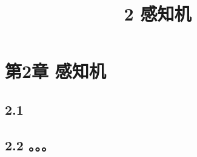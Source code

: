 \documentclass{article}
\begin{document}
\title{2 感知机}
\date{}
\maketitle
\else
\chapter*{第2章 感知机}
\fi
\section*{2.1 }

\section*{2.2 。。。}
\ifx\allfiles\undefined
\end{document}
